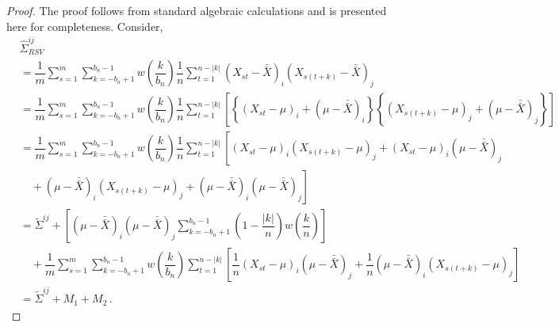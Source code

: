 \documentclass[11pt]{article}
\theoremstyle{remark}
\begin{document}
\begin{proof}
The proof follows from standard algebraic calculations and is presented here for completeness. Consider,
\begin{align*}
&\hat{\Sigma}_{RSV}^{ij} \\
&= \dfrac{1}{m}\sum_{s=1}^{m} \sum_{k=-b_n+1}^{b_n-1}w\left(\dfrac{k}{b_n}\right)\dfrac{1}{n}\sum_{t=1}^{n-|k|} \left(X_{st}-\bar{\bar{X}} \right)_i \left(X_{s(t+k)}-\bar{\bar{X}} \right)_j\\
&= \dfrac{1}{m}\sum_{s=1}^{m}\sum_{k=-b_n+1}^{b_n-1}w\left(\dfrac{k}{b_n}\right)\dfrac{1}{n}\sum_{t=1}^{n-|k|} \left[  \left\{\left(X_{st}-\mu \right)_i + \left(\mu-\bar{\bar{X}} \right)_i \right \}  \left\{ \left(X_{s(t+k)}-\mu \right)_j + \left(\mu-\bar{\bar{X}} \right)_j \right \} \right]\\
&= \dfrac{1}{m}\sum_{s=1}^{m}\sum_{k=-b_n+1}^{b_n-1}w\left(\dfrac{k}{b_n}\right)\dfrac{1}{n}\sum_{t=1}^{n-|k|}  \left[ \left(X_{st}-\mu \right)_i  \left(X_{s(t+k)}-\mu \right)_j+  \left(X_{st} - \mu \right)_i    \left(\mu - \bar{\bar{X}} \right)_j \right. \\  
& \quad + \left. \left(\mu-\bar{\bar{X}} \right)_i  \left(X_{s(t+k)}-\mu \right)_j + \left(\mu-\bar{\bar{X}} \right)_i  \left(\mu-\bar{\bar{X}}  \right)_j  \right]\\
& = \tilde{\Sigma}^{ij} + \left[(\mu-\bar{\bar{X}})_i(\mu-\bar{\bar{X}})_j\sum_{k=-b_n+1}^{b_n-1}\left(1-\dfrac{|k|}{n}\right)w\left(\dfrac{k}{n}\right)\right] \\ 
& \quad  + \dfrac{1}{m}\sum_{s=1}^{m}\sum_{k=-b_n+1}^{b_n-1}  w\left(\dfrac{k}{b_n}\right)\sum_{t=1}^{n-|k|}  \left[\dfrac{1}{n} \left(X_{st} - \mu \right)_i \left(\mu - \bar{\bar{X}} \right)_j + \dfrac{1}{n} \left(\mu-\bar{\bar{X}} \right)_i  \left(X_{s(t+k)}-\mu \right)_j \right] \\ 
& = \tilde{\Sigma}^{ij} + M_1 + M_2\,.
\end{align*}
%
\end{proof}
\end{document}
